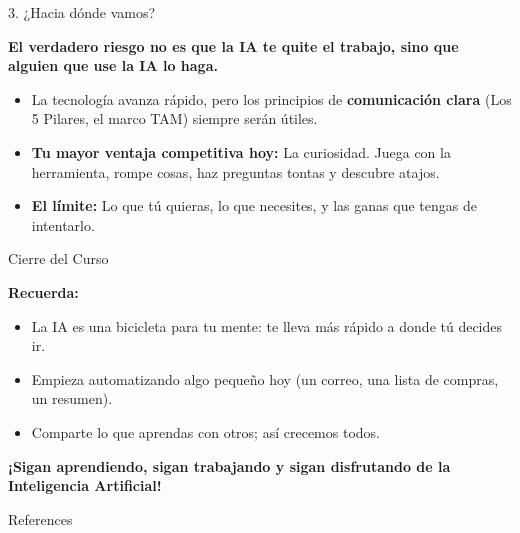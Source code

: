 \documentclass[aspectratio=169]{beamer}
\begin{document}
\begin{frame}[fragile]{3. ¿Hacia dónde vamos?}


\textbf{El verdadero riesgo no es que la IA te quite el trabajo, sino que alguien que use la IA lo haga.}

\begin{itemize}
  \item La tecnología avanza rápido, pero los principios de \textbf{comunicación clara} (Los 5 Pilares, el marco TAM) siempre serán útiles.
  \item \textbf{Tu mayor ventaja competitiva hoy:} La curiosidad. Juega con la herramienta, rompe cosas, haz preguntas tontas y descubre atajos.
  \item \textbf{El límite:} Lo que tú quieras, lo que necesites, y las ganas que tengas de intentarlo.
\end{itemize}
\end{frame}



\begin{frame}[fragile]{Cierre del Curso}


\textbf{Recuerda:}
\begin{itemize}
  \item La IA es una bicicleta para tu mente: te lleva más rápido a donde tú decides ir.
  \item Empieza automatizando algo pequeño hoy (un correo, una lista de compras, un resumen).
  \item Comparte lo que aprendas con otros; así crecemos todos.
\end{itemize}
\textbf{¡Sigan aprendiendo, sigan trabajando y sigan disfrutando de la Inteligencia Artificial!}
\end{frame}




\begin{frame}[allowframebreaks]{References}
  
  
\end{frame}
\end{document}
